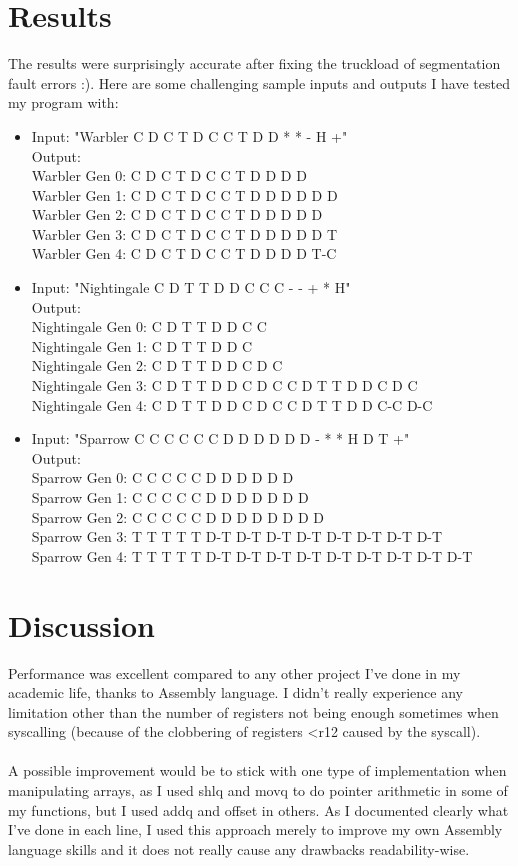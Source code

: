 \documentclass[a4paper,12pt]{article}
\begin{document}
\section{Results}
The results were surprisingly accurate after fixing the truckload of segmentation fault errors :). Here are some challenging sample inputs and outputs I have tested my program with:\begin{itemize}
    \item Input: "Warbler C D C T D C C T D D * * - H +"\\Output:\\Warbler Gen 0: C D C T D C C T D D D D\\Warbler Gen 1: C D C T D C C T D D D D D D\\Warbler Gen 2: C D C T D C C T D D D D D\\Warbler Gen 3: C D C T D C C T D D D D D T\\Warbler Gen 4: C D C T D C C T D D D D T-C
    \item Input: "Nightingale C D T T D D C C C - - + * H"\\Output:\\Nightingale Gen 0: C D T T D D C C\\Nightingale Gen 1: C D T T D D C\\Nightingale Gen 2: C D T T D D C D C\\Nightingale Gen 3: C D T T D D C D C C D T T D D C D C\\Nightingale Gen 4: C D T T D D C D C C D T T D D C-C D-C
    \item Input: "Sparrow C C C C C C D D D D D D - * * H D T +"\\Output:\\Sparrow Gen 0: C C C C C D D D D D D\\Sparrow Gen 1: C C C C C D D D D D D D\\Sparrow Gen 2: C C C C C D D D D D D D D\\Sparrow Gen 3: T T T T T D-T D-T D-T D-T D-T D-T D-T D-T\\Sparrow Gen 4: T T T T T D-T D-T D-T D-T D-T D-T D-T D-T D-T
\end{itemize}

\section{Discussion}
Performance was excellent compared to any other project I've done in my academic life, thanks to Assembly language. I didn't really experience any limitation other than the number of registers not being enough sometimes when syscalling (because of the clobbering of registers <r12 caused by the syscall).\\\\ A possible improvement would be to stick with one type of implementation when manipulating arrays, as I used shlq and movq to do pointer arithmetic in some of my functions, but I used addq and offset in others. As I documented clearly what I've done in each line, I used this approach merely to improve my own Assembly language skills and it does not really cause any drawbacks readability-wise.
\end{document}
